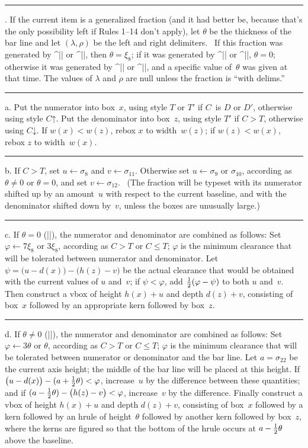\rule 15. If the current item is a generalized fraction (and it had better
be, because that's the only possibility left if Rules 1--14 don't apply),
let $\theta$ be the thickness of the bar line and let $(\lambda,\rho)$ be
the left and right delimiters. \ If this fraction was generated by
^|\over| or ^|\overwithdelims|, then $\theta=\xi_8$; if it was generated by
^|\atop| or ^|\atopwithdelims|, $\theta=0$; otherwise it was generated by
^|\above| or ^|\abovewithdelims|, and a specific value of~$\theta$ was
given at that time. The values of $\lambda$ and $\rho$ are null unless
the fraction is ``with delims.''

\rule 15a. Put the numerator into box~$x$, using style $T$ or $T'$ if
$C$~is $D$ or $D'$, otherwise using style $C\mathord\uparrow$.
Put the denominator into box~$z$, using style $T'$ if
$C>T$, otherwise using $C\mathord\downarrow$.
If $w(x)<w(z)$, rebox $x$ to width~$w(z)$;
if $w(z)<w(x)$, rebox $z$ to width~$w(x)$.

\rule 15b. If $C>T$, set $u\leftarrow\sigma_8$ and $v\leftarrow\sigma_{11}$.
Otherwise set $u\leftarrow\sigma_9$ or $\sigma_{10}$, according as $\theta\ne0$
or $\theta=0$, and set $v\leftarrow\sigma_{12}$. \ (The fraction will be
typeset with its numerator shifted up by an amount~$u$ with respect to
the current baseline, and with the denominator shifted down by~$v$,
unless the boxes are unusually large.)

\rule 15c. If $\theta=0$ (|\atop|), the numerator and denominator are
combined as follows: Set $\varphi\leftarrow7\xi_8$ or
$3\xi_8$, according as $C>T$ or $C\le T$; $\varphi$ is the minimum
clearance that will be tolerated between numerator and denominator.
Let $\psi=\bigl(u-d(x)\bigr)-\bigl(h(z)-v\bigr)$ be the actual clearance
that would be obtained with the current values of $u$ and~$v$; if
$\psi<\varphi$, add ${1\over2}(\varphi-\psi)$ to both $u$ and~$v$.
Then construct a vbox of height $h(x)+u$ and depth $d(z)+v$, consisting
of box~$x$ followed by an appropriate kern followed by box~$z$.

\rule 15d. If $\theta\ne0$ (|\over|), the numerator and denominator are
combined as follows: Set $\varphi\leftarrow3\theta$ or $\theta$, according
as $C>T$ or $C\le T$; $\varphi$ is the minimum clearance that will be
tolerated between numerator or denominator and the bar line.  Let
$a=\sigma_{22}$ be the current axis height; the middle of the bar line
will be placed at this height.  If
$\bigl(u-d(x)\bigr)-(a+{1\over2}\theta)<\varphi$, increase~$u$ by the
difference between these quantities; and if $(a-{1\over2}\theta)-
\bigl(h(z)-v\bigr)<\varphi$, increase~$v$ by the difference. Finally
construct a vbox of height $h(x)+u$ and depth $d(z)+v$, consisting of
box~$x$ followed by a kern followed by an hrule of height~$\theta$
followed by another kern followed by box~$z$, where the kerns are figured
so that the bottom of the hrule occurs at $a-{1\over2}\theta$ above the
baseline.


